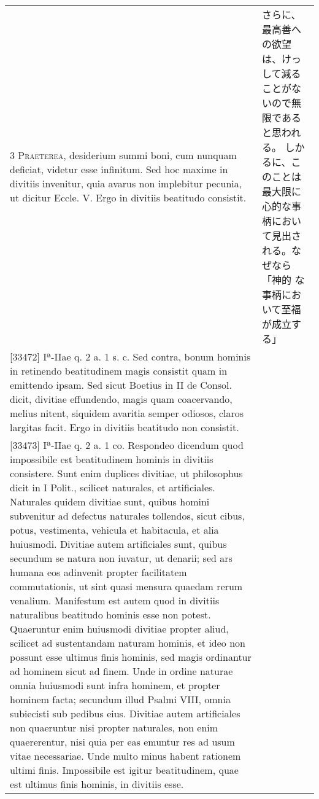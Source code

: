 \documentclass[10pt]{jsarticle} %
\begin{document}
\begin{longtable}{p{21em}p{21em}}
{\scshape 3 Praeterea}, desiderium summi boni, cum
 nunquam deficiat, videtur esse infinitum. Sed hoc maxime in divitiis
 invenitur, quia avarus non implebitur pecunia, ut dicitur
 Eccle. V. Ergo in divitiis beatitudo consistit.

 
&

さらに、最高善への欲望は、けっして減ることがないので無限であると思われる。
しかるに、このことは最大限に心的な事柄において見出される。なぜなら「神的
 な事柄において至福が成立する」


\\




[33472] Iª-IIae q. 2 a. 1 s. c. Sed contra, bonum hominis in retinendo
 beatitudinem magis consistit quam in emittendo ipsam. Sed sicut Boetius
 in II de Consol. dicit, divitiae effundendo, magis quam coacervando,
 melius nitent, siquidem avaritia semper odiosos, claros largitas
 facit. Ergo in divitiis beatitudo non consistit.

 
&


\\




[33473] Iª-IIae q. 2 a. 1 co. Respondeo dicendum quod impossibile est
 beatitudinem hominis in divitiis consistere. Sunt enim duplices
 divitiae, ut philosophus dicit in I Polit., scilicet naturales, et
 artificiales. Naturales quidem divitiae sunt, quibus homini subvenitur
 ad defectus naturales tollendos, sicut cibus, potus, vestimenta,
 vehicula et habitacula, et alia huiusmodi. Divitiae autem artificiales
 sunt, quibus secundum se natura non iuvatur, ut denarii; sed ars humana
 eos adinvenit propter facilitatem commutationis, ut sint quasi mensura
 quaedam rerum venalium. Manifestum est autem quod in divitiis
 naturalibus beatitudo hominis esse non potest. Quaeruntur enim
 huiusmodi divitiae propter aliud, scilicet ad sustentandam naturam
 hominis, et ideo non possunt esse ultimus finis hominis, sed magis
 ordinantur ad hominem sicut ad finem. Unde in ordine naturae omnia
 huiusmodi sunt infra hominem, et propter hominem facta; secundum illud
 Psalmi VIII, omnia subiecisti sub pedibus eius. Divitiae autem
 artificiales non quaeruntur nisi propter naturales, non enim
 quaererentur, nisi quia per eas emuntur res ad usum vitae
 necessariae. Unde multo minus habent rationem ultimi finis. Impossibile
 est igitur beatitudinem, quae est ultimus finis hominis, in divitiis
 esse.

 
&


\\





\end{longtable}
\end{document}
